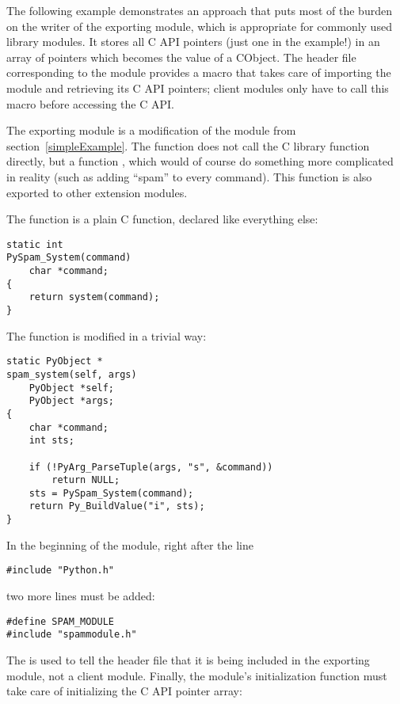The following example demonstrates an approach that puts most of the
burden on the writer of the exporting module, which is appropriate
for commonly used library modules. It stores all C API pointers
(just one in the example!) in an array of  pointers which
becomes the value of a CObject. The header file corresponding to
the module provides a macro that takes care of importing the module
and retrieving its C API pointers; client modules only have to call
this macro before accessing the C API.

The exporting module is a modification of the  module from
section~\ref{simpleExample}. The function 
does not call the C library function  directly,
but a function , which would of course do
something more complicated in reality (such as adding ``spam'' to
every command). This function  is also
exported to other extension modules.

The function  is a plain C function,
declared  like everything else:

\begin{verbatim}
static int
PySpam_System(command)
    char *command;
{
    return system(command);
}
\end{verbatim}

The function  is modified in a trivial way:

\begin{verbatim}
static PyObject *
spam_system(self, args)
    PyObject *self;
    PyObject *args;
{
    char *command;
    int sts;

    if (!PyArg_ParseTuple(args, "s", &command))
        return NULL;
    sts = PySpam_System(command);
    return Py_BuildValue("i", sts);
}
\end{verbatim}

In the beginning of the module, right after the line

\begin{verbatim}
#include "Python.h"
\end{verbatim}

two more lines must be added:

\begin{verbatim}
#define SPAM_MODULE
#include "spammodule.h"
\end{verbatim}

The  is used to tell the header file that it is being
included in the exporting module, not a client module. Finally,
the module's initialization function must take care of initializing
the C API pointer array:

